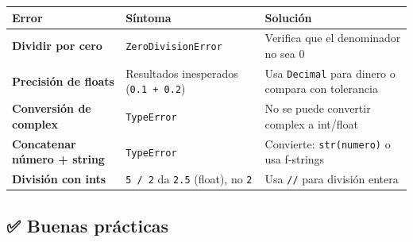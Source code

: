 \documentclass[
  doc,
  floatsintext,
  longtable,
  a4paper,
  nolmodern,
  notxfonts,
  notimes,
  12pt,
  colorlinks=true,linkcolor=blue,citecolor=blue,urlcolor=blue]{apa7}
\newcounter{none} %
\begin{document}
{\def\LTcaptype{none} %
\begin{longtable}[]{@{}
  >{\raggedright\arraybackslash}p{}
  >{\raggedright\arraybackslash}p{}
  >{\raggedright\arraybackslash}p{}@{}}
\toprule\noalign{}
\begin{minipage}[b]{\linewidth}\raggedright
Error
\end{minipage} & \begin{minipage}[b]{\linewidth}\raggedright
Síntoma
\end{minipage} & \begin{minipage}[b]{\linewidth}\raggedright
Solución
\end{minipage} \\
\midrule\noalign{}
\endhead
\bottomrule\noalign{}
\endlastfoot
\textbf{Dividir por cero} & \texttt{ZeroDivisionError} & Verifica que el
denominador no sea 0 \\
\textbf{Precisión de floats} & Resultados inesperados
(\texttt{0.1\ +\ 0.2}) & Usa \texttt{Decimal} para dinero o compara con
tolerancia \\
\textbf{Conversión de complex} & \texttt{TypeError} & No se puede
convertir complex a int/float \\
\textbf{Concatenar número + string} & \texttt{TypeError} & Convierte:
\texttt{str(numero)} o usa f-strings \\
\textbf{División con ints} & \texttt{5\ /\ 2} da \texttt{2.5} (float),
no \texttt{2} & Usa \texttt{//} para división entera \\
\end{longtable}
}

\subsection{✅ Buenas prácticas}\label{buenas-pruxe1cticas}
\end{document}
